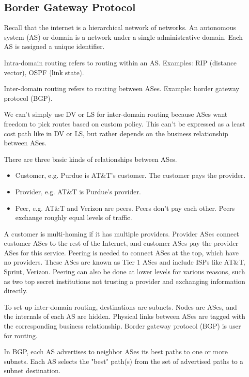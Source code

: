 \subsection{Border Gateway Protocol}

Recall that the internet is a hierarchical network of networks.
An autonomous system (AS) or domain is a network under a single
administrative domain. Each AS is assigned a unique identifier.

Intra-domain routing refers to routing within an AS. Examples:
RIP (distance vector), OSPF (link state).

Inter-domain routing refers to routing between ASes. Example: border gateway
protocol (BGP).

We can't simply use DV or LS for inter-domain routing because ASes want freedom
to pick routes based on custom policy. This can't be expressed as a least cost path
like in DV or LS, but rather depends on the business relationship between
ASes.

There are three basic kinds of relationships between ASes.

\begin{itemize}
      \item Customer, e.g. Purdue is AT\&T's customer. The customer pays the provider.
      \item Provider, e.g. AT\&T is Purdue's provider.
      \item Peer, e.g. AT\&T and Verizon are peers. Peers don't pay each other.
            Peers exchange roughly equal levels of traffic.
\end{itemize}

A customer is multi-homing if it has multiple providers. Provider ASes connect
customer ASes to the rest of the Internet, and customer ASes
pay the provider ASes for this service. Peering is needed to connect ASes
at the top, which have no providers. These ASes are known as Tier 1 ASes and
include ISPs like AT\&T, Sprint, Verizon. Peering can also be done at lower
levels for various reasons, such as two top secret institutions not trusting
a provider and exchanging information directly.

To set up inter-domain routing, destinations are subnets. Nodes are ASes, and
the internals of each AS are hidden. Physical links between ASes are tagged
with the corresponding business relationship. Border gateway protocol (BGP) is
user for routing.

In BGP, each AS advertises to neighbor ASes its best paths to one or more
subnets. Each AS selects the "best" path(s) from the set of advertised paths
to a subnet destination.

